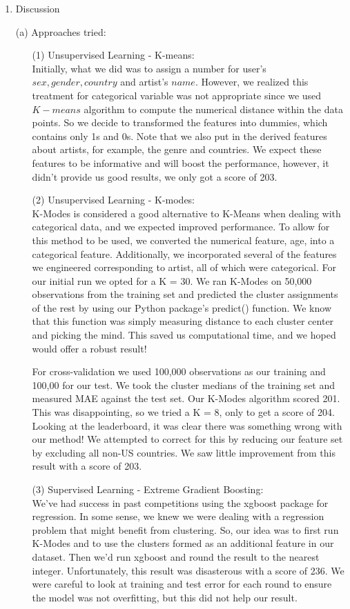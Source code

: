 \documentclass[12pt]{article}
\newcommand\tab[1][0.5cm]{\hspace*{#1}}
\begin{document}
\begin{enumerate}
\newpage
\item
Discussion

\item[(a)]
Approaches tried:
\begin{itemize}
\item[(1)]
Unsupervised Learning - K-means:\\
\tab Initially, what we did was to assign a number for user's $sex, gender, country$ and artist's $name$. However, we realized this treatment for categorical variable was not appropriate since we used $K-means$ algorithm to compute the numerical distance within the data points. So we decide to transformed the features into dummies, which contains only 1s and 0s. Note that we also put in the derived features about artists, for example, the genre and countries. We expect these features to be informative and will boost the performance, however, it didn't provide us good results, we only got a score of 203.



\item[(2)]
Unsupervised Learning - K-modes:\\
\tab K-Modes is considered a good alternative to K-Means when dealing with categorical data, and we expected improved performance. To allow for this method to be used, we converted the numerical feature, age, into a categorical feature. Additionally, we incorporated several of the features we engineered corresponding to artist, all of which were categorical.  For our initial run we opted for a K = 30.  We ran K-Modes on 50,000 observations from the training set and predicted the cluster assignments of the rest by using our Python package's predict() function.  We know that this function was simply measuring distance to each cluster center and picking the mind.  This saved us computational time, and we hoped would offer a robust result!  

\tab For cross-validation we used 100,000 observations as our training and 100,00 for our test.  We took the cluster medians of the training set and measured MAE against the test set.  Our K-Modes algorithm scored 201.  This was disappointing, so we tried a K = 8, only to get a score of 204.  Looking at the leaderboard, it was clear there was something wrong with our method!  We attempted to correct for this by reducing our feature set by excluding all non-US countries.  We saw little improvement from this result with a score of 203.

\item[(3)]
Supervised Learning - Extreme Gradient Boosting:\\ 
\tab We've had success in past competitions using the xgboost package for regression.  In some sense, we knew we were dealing with a regression problem that might benefit from clustering.  So, our idea was to first run K-Modes and to use the clusters formed as an additional feature in our dataset.  Then we'd run xgboost and round the result to the nearest integer.  Unfortunately, this result was disasterous with a score of 236.  We were careful to look at training and test error for each round to ensure the model was not overfitting, but this did not help our result.  


\end{itemize}
\end{enumerate}
\end{document}
